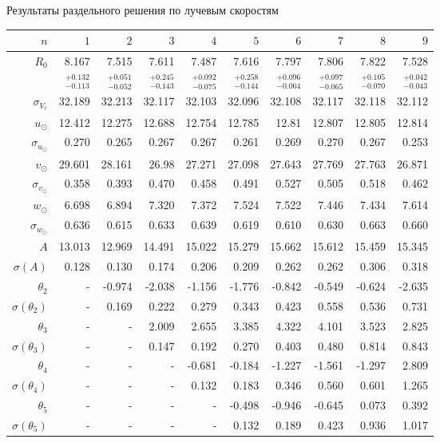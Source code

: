 \documentclass[compress]{beamer}
\newcommand\Fontvi{\fontsize{6}{7.2}\selectfont}
\begin{document}
\begin{frame}{Результаты раздельного решения по лучевым скоростям}
\Fontvi
\begin{table}[h!!]
\centering
\begin{tabular}{r|rr|r|rrrrrr}
\hline
 $n$ & $1$ & $2$ & $3$ & $4$ & $5$&$ 6 $&$ 7 $&$ 8 $&$ 9 $\\\hline
 $R_0 $& 8.167       &   7.515 &   7.611 &   7.487 &   7.616 &   7.797 &   7.806 &   7.822 &   7.528  \\
       & $_{-0.113}^{+0.132} $ & $_{-0.052}^{+0.051}$  & $_{-0.143}^{+0.245}$   & $_{-0.075}^{+0.092}$  & $_{-0.144}^{+0.258}$  & $_{-0.064}^{+0.096}$  & $_{-0.065}^{+0.097}$  & $_{-0.070}^{+0.105}$  & $_{-0.043}^{+0.042}$  \\\hline
 $\sigma_{V_r} $& 32.189      &  32.213 &  32.117 &  32.103 &  32.096 &  32.108 &  32.117 &  32.118 &  32.112  \\
 $ u_{\odot} $& 12.412      &  12.275 &  12.688 &  12.754 &  12.785 &   12.81 &  12.807 &  12.805 &  12.814  \\
 $\sigma_{u_{\odot}} $&0.270       &   0.265 &   0.267 &   0.267 &   0.261 &   0.269 &    0.270 &   0.267 &   0.253  \\
 $v_{\odot} $& 29.601      &  28.161 &   26.98 &  27.271 &  27.098 &  27.643 &  27.769 &  27.763 &  26.871  \\
 $\sigma_{v_{\odot}}$&0.358       &   0.393 &    0.470 &   0.458 &   0.491 &   0.527 &   0.505 &   0.518 &   0.462  \\
 $w_{\odot} $&6.698       &   6.894 &    7.320 &   7.372 &   7.524 &   7.522 &   7.446 &   7.434 &   7.614  \\
 $\sigma_{w_{\odot}} $& 0.636       &   0.615 &   0.633 &   0.639 &   0.619 &    0.610 &    0.630 &   0.663 &    0.660  \\\hline
 $A $&13.013      &  12.969 &  14.491 &  15.022 &  15.279 &  15.662 &  15.612 &  15.459 &  15.345  \\
 $\sigma(A) $ & 0.128     &    0.130 &   0.174 &   0.206 &   0.209 &   0.262 &   0.262 &   0.306 &   0.318  \\
 $\theta_2$&-        &  -0.974 &  -2.038 &  -1.156 &  -1.776 &  -0.842 &  -0.549 &  -0.624 &  -2.635  \\
 $\sigma(\theta_2)$&-      &   0.169 &   0.222 &   0.279 &   0.343 &   0.423 &   0.558 &   0.536 &   0.731  \\
 $\theta_3$&-      &    - &   2.009 &   2.655 &   3.385 &   4.322 &   4.101 &   3.523 &   2.825  \\
 $\sigma(\theta_3)$&-      &    - &   0.147 &   0.192 &   0.270 &   0.403 &   0.480 &   0.814 &   0.843  \\
 $\theta_4$&-      &    - &    - &  -0.681 &  -0.184 &  -1.227 &  -1.561 &  -1.297 &   2.809  \\
 $\sigma(\theta_4)$&-      &    - &    - &   0.132 &   0.183 &   0.346 &   0.560 &   0.601 &   1.265  \\
 $\theta_5$&-      &    - &    - &    - &  -0.498 &  -0.946 &  -0.645 &   0.073 &   0.392  \\
 $\sigma(\theta_5)$&-      &    - &    - &    - &   0.132 &   0.189 &   0.423 &   0.936 &   1.017  \\


\end{tabular}
\end{table}
\end{frame}
\end{document}
